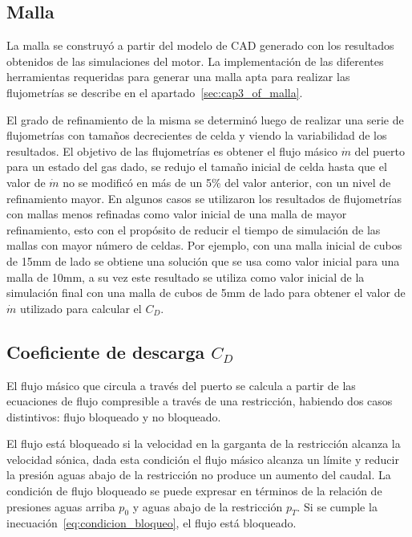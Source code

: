 \subsection{Malla}

La malla se construyó a partir del modelo de CAD generado con los resultados
obtenidos de las simulaciones del motor.
%
La implementación de las diferentes herramientas requeridas para generar una
malla apta para realizar las flujometrías se describe en el
apartado~\ref{sec:cap3_of_malla}.

El grado de refinamiento de la misma se determinó luego de realizar una serie de
flujometrías con tamaños decrecientes de celda y viendo la variabilidad de los
resultados.
%
El objetivo de las flujometrías es obtener el flujo másico $\dot{m}$ del puerto
para un estado del gas dado, se redujo el tamaño inicial de celda hasta que el
valor de $\dot{m}$ no se modificó en más de un 5\% del valor anterior, con un
nivel de refinamiento mayor.
%
En algunos casos se utilizaron los resultados de flujometrías con mallas menos
refinadas como valor inicial de una malla de mayor refinamiento, esto con el
propósito de reducir el tiempo de simulación de las mallas con mayor número de
celdas.
%
Por ejemplo, con una malla inicial de cubos de 15mm de lado se obtiene una
solución que se usa como valor inicial para una malla de 10mm, a su vez este
resultado se utiliza como valor inicial de la simulación final con una malla de
cubos de 5mm de lado para obtener el valor de $\dot{m}$ utilizado para calcular
el $C_{D}$.

\subsection{Coeficiente de descarga $C_{D}$}\label{sec:cap2_cd}

El flujo másico que circula a través del puerto se calcula a partir de las
ecuaciones de flujo compresible a través de una restricción, habiendo dos casos
distintivos: flujo bloqueado y no bloqueado.

El flujo está bloqueado si la velocidad en la garganta de la restricción alcanza
la velocidad sónica, dada esta condición el flujo másico alcanza un límite y
reducir la presión aguas abajo de la restricción no produce un aumento del caudal.
%
La condición de flujo bloqueado se puede expresar en términos de la relación de
presiones aguas arriba $p_{0}$ y aguas abajo de la restricción $p_{T}$.
%
Si se cumple la inecuación~\ref{eq:condicion_bloqueo}, el flujo está bloqueado.

